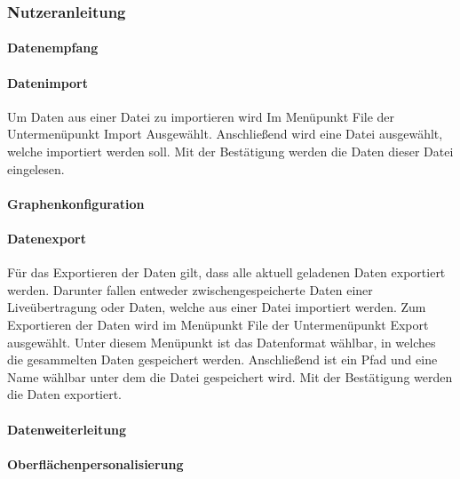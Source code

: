 \subsubsection{Nutzeranleitung}
\paragraph{Datenempfang}
\paragraph{Datenimport}
Um Daten aus einer Datei zu importieren wird Im Menüpunkt File der Untermenüpunkt Import Ausgewählt. Anschließend wird eine Datei ausgewählt, welche importiert werden soll. Mit der Bestätigung werden die Daten dieser Datei eingelesen.
\paragraph{Graphenkonfiguration}
\paragraph{Datenexport}
Für das Exportieren der Daten gilt, dass alle aktuell geladenen Daten exportiert werden. Darunter fallen entweder zwischengespeicherte Daten einer Liveübertragung oder Daten, welche aus einer Datei importiert werden.
Zum Exportieren der Daten wird im Menüpunkt File der Untermenüpunkt Export ausgewählt. Unter diesem Menüpunkt ist das Datenformat wählbar, in welches die gesammelten Daten gespeichert werden. Anschließend ist ein Pfad und eine Name wählbar unter dem die Datei gespeichert wird. Mit der Bestätigung werden die Daten exportiert.
\paragraph{Datenweiterleitung}
\paragraph{Oberflächenpersonalisierung}